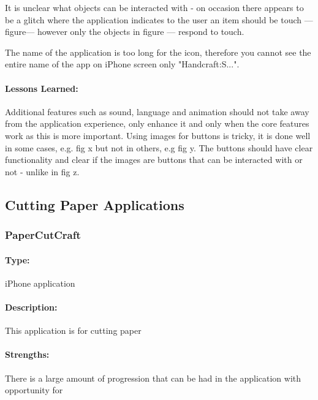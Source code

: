 \documentclass[11pt]{article}
\begin{document}
                It is unclear what objects can be interacted with - on occasion there appears to be a glitch where the application indicates to the user an item should be touch --- figure--- however only the objects in figure --- respond to touch. 
                
                The name of the application is too long for the icon, therefore you cannot see the entire name of the app on iPhone screen only "Handcraft:S...".
                
                \paragraph{Lessons Learned:}   
                Additional features such as sound, language and animation should not take away from the application experience, only enhance it and only when the core features work as this is more important. Using images for buttons is tricky, it is done well in some cases, e.g. fig x but not in others, e.g fig y. The buttons should have clear functionality and clear if the images are buttons that can be interacted with or not - unlike in fig z. 
                
        \subsection{Cutting Paper Applications}
            \subsubsection{PaperCutCraft}
            
                \paragraph{Type:} iPhone application 
                 
                \paragraph{Description:} This application is for cutting paper

                \paragraph{Strengths:}
                There is a large amount of progression that can be had in the application with opportunity for
                
\end{document}
